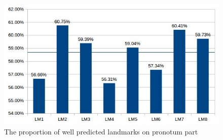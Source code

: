 \documentclass[12pt,a4paper]{article}
\begin{document}
\begin{figure}[h!]
	\centering
	\includegraphics[scale=0.5]{images/pronotum}
	\caption{The proportion of well predicted landmarks on pronotum part}
	\label{pronofig}
\end{figure}~\\[1cm]
\end{document}

